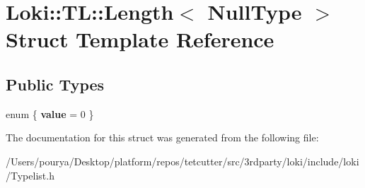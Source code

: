 \hypertarget{structLoki_1_1TL_1_1Length_3_01NullType_01_4}{}\section{Loki\+:\+:T\+L\+:\+:Length$<$ Null\+Type $>$ Struct Template Reference}
\label{structLoki_1_1TL_1_1Length_3_01NullType_01_4}
\subsection*{Public Types}
\begin{DoxyCompactItemize}
\item 
\hypertarget{structLoki_1_1TL_1_1Length_3_01NullType_01_4_a624dd9018257f062813359b8526535a9}{}enum \{ {\bfseries value} = 0
 \}\label{structLoki_1_1TL_1_1Length_3_01NullType_01_4_a624dd9018257f062813359b8526535a9}

\end{DoxyCompactItemize}


The documentation for this struct was generated from the following file\+:\begin{DoxyCompactItemize}
\item 
/\+Users/pourya/\+Desktop/platform/repos/tetcutter/src/3rdparty/loki/include/loki/Typelist.\+h\end{DoxyCompactItemize}
